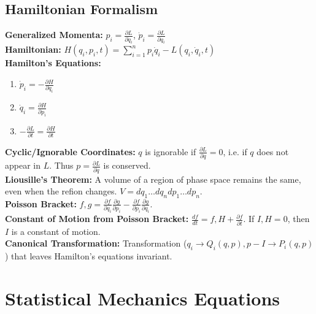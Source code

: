 \documentclass[12pt]{extarticle}
\begin{document}
\subsection*{Hamiltonian Formalism}
\textbf{Generalized Momenta: } $p_i = \frac{\partial L}{\partial \dot{q}_i}$, $\dot{p}_i = \frac{\partial L}{\partial q_i}$ \\
\textbf{Hamiltonian: } $H(q_i,p_i,t) = \sum\limits_{i=1}^n p_i\dot{q}_i - L(q_i,\dot{q}_i,t)$ \\
\textbf{Hamilton's Equations:}
\begin{enumerate}
  \item $\dot{p}_i = -\frac{\partial H}{\partial q_i}$
  \item $\dot{q}_i = \frac{\partial H}{\partial p_i}$
  \item $-\frac{\partial L}{\partial t} = \frac{\partial H}{\partial t}$
\end{enumerate}
\textbf{Cyclic/Ignorable Coordinates:} $q$ is ignorable if $\frac{\partial L}{\partial q} = 0$, i.e. if $q$ does not appear in $L$. Thus $p=\frac{\partial L}{\partial \dot{q}}$ is conserved. \\
\textbf{Liousille's Theorem: } A volume of a region of phase space remains the same, even when the refion changes. $V=dq_1 \ldots dq_ndp_1 \ldots dp_n$. \\
\textbf{Poisson Bracket: } ${f,g} = \frac{\partial f}{\partial q_i}\frac{\partial g}{\partial p_i} - \frac{\partial f}{\partial p_i}\frac{\partial g}{\partial q_i}$. \\
\textbf{Constant of Motion from Poisson Bracket: } $\frac{df}{dt} = {f,H}+\frac{\partial f}{\partial t}$. If ${I,H}=0$, then $I$ is a constant of motion. \\
\textbf{Canonical Transformation: } Transformation ($q_i \rightarrow Q_i(q,p), p-I \rightarrow P_i(q,p)$) that leaves Hamilton's equations invariant. \\

\section{Statistical Mechanics Equations}
\end{document}
